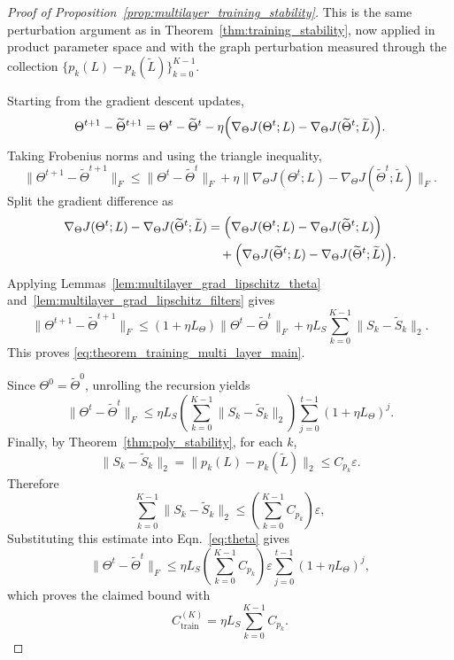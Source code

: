 \documentclass{article}
\begin{document}
\begin{proof}[Proof of Proposition~\ref{prop:multilayer_training_stability}]
This is the same perturbation argument as in Theorem~\ref{thm:training_stability}, now applied in product parameter space and with the graph perturbation measured through the collection $\{p_k(L)-p_k(\widetilde L)\}_{k=0}^{K-1}$.

Starting from the gradient descent updates,
\begin{equation}
\Theta^{t+1}-\widetilde\Theta^{t+1}
=
\Theta^t-\widetilde\Theta^t
-
\eta\Bigl(
\nabla_\Theta J(\Theta^t;L)
-
\nabla_\Theta J(\widetilde\Theta^t;\widetilde L)
\Bigr).
\label{eq:app_multilayer_gd_difference}
\end{equation}
Taking Frobenius norms and using the triangle inequality,
\begin{equation}
\|\Theta^{t+1}-\widetilde\Theta^{t+1}\|_F
\le
\|\Theta^t-\widetilde\Theta^t\|_F
+
\eta
\|\nabla_\Theta J(\Theta^t;L)
-
\nabla_\Theta J(\widetilde\Theta^t;\widetilde L)\|_F.
\label{eq:app_multilayer_basic_recursion}
\end{equation}
Split the gradient difference as
\begin{align}
\nabla_\Theta J(\Theta^t;L)-\nabla_\Theta J(\widetilde\Theta^t;\widetilde L)
&=
\Bigl(
\nabla_\Theta J(\Theta^t;L)
-
\nabla_\Theta J(\widetilde\Theta^t;L)
\Bigr) \notag\\
&\quad+
\Bigl(
\nabla_\Theta J(\widetilde\Theta^t;L)
-
\nabla_\Theta J(\widetilde\Theta^t;\widetilde L)
\Bigr).
\label{eq:app_multilayer_gradient_split}
\end{align}
Applying Lemmas~\ref{lem:multilayer_grad_lipschitz_theta} and~\ref{lem:multilayer_grad_lipschitz_filters} gives
\[
\|\Theta^{t+1}-\widetilde\Theta^{t+1}\|_F
\le
(1+\eta L_\Theta)\|\Theta^t-\widetilde\Theta^t\|_F
+
\eta L_S
\sum_{k=0}^{K-1}\|S_k-\widetilde S_k\|_2.
\]
This proves \eqref{eq:theorem_training_multi_layer_main}.

Since $\Theta^0=\widetilde\Theta^0$, unrolling the recursion yields
\begin{equation}
\label{eq:theta}
\|\Theta^t-\widetilde\Theta^t\|_F
\le
\eta L_S
\left(
\sum_{k=0}^{K-1}\|S_k-\widetilde S_k\|_2
\right)
\sum_{j=0}^{t-1}(1+\eta L_\Theta)^j.
\end{equation}
Finally, by Theorem~\ref{thm:poly_stability}, for each $k$,
\[
\|S_k-\widetilde S_k\|_2
=
\|p_k(L)-p_k(\widetilde L)\|_2
\le
C_{p_k}\varepsilon.
\]
Therefore
\[
\sum_{k=0}^{K-1}\|S_k-\widetilde S_k\|_2
\le
\left(\sum_{k=0}^{K-1}C_{p_k}\right)\varepsilon,
\]
Substituting this estimate into Eqn.~\ref{eq:theta} gives
\[
\|\Theta^t-\widetilde\Theta^t\|_F
\le
\eta L_S
\left(\sum_{k=0}^{K-1} C_{p_k}\right)
\varepsilon
\sum_{j=0}^{t-1}(1+\eta L_\Theta)^j,
\]
which proves the claimed bound with
\[
C_{\mathrm{train}}^{(K)}
=
\eta L_S\sum_{k=0}^{K-1} C_{p_k}.
\]
\end{proof}
\end{document}
